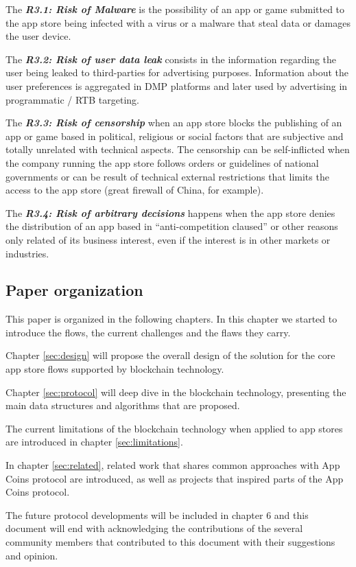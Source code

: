 \begin{tcolorbox}[enhanced jigsaw,sharp corners, drop fuzzy shadow=ShadowColor]

The {\bf\em R3.1: Risk of Malware} is the possibility of an app or game submitted to the app store being infected with a virus or a malware that steal data or damages the user device.

The {\bf\em R3.2: Risk of user data leak} consists in the information regarding the user being leaked to third-parties for advertising purposes. Information about the user preferences is aggregated in DMP platforms and later used by advertising in programmatic / RTB targeting.


The {\bf\em R3.3: Risk of censorship} when an app store blocks the publishing of an app or game based in political, religious or social factors that are subjective and totally unrelated with technical aspects. The censorship can be self-inflicted when the company running the app store follows orders or guidelines of national governments or can be result of technical external restrictions that limits the access to the app store (great firewall of China, for example).

The {\bf\em R3.4: Risk of arbitrary decisions} happens when the app store denies the distribution of an app based in ``anti-competition claused''\cite{PlayTermsService} or other reasons only related of its business interest, even if the interest is in other markets or industries.

\end{tcolorbox}

\subsection{Paper organization}

This paper is organized in the following chapters. In this chapter we started to introduce the flows, the current challenges and the flaws they carry.

Chapter \ref{sec:design} will propose the overall design of the solution for the core app store flows supported by blockchain technology. 

Chapter \ref{sec:protocol} will deep dive in the blockchain technology, presenting the main data structures and algorithms that are proposed.

The current limitations of the blockchain technology when applied to app stores are introduced in chapter \ref{sec:limitations}.

In chapter \ref{sec:related}, related work that shares common approaches with App Coins protocol are introduced, as well as projects that inspired parts of the App Coins protocol.


The future protocol developments will be included in chapter 6 and this document will end with acknowledging the contributions of the several community members that contributed to this document with their suggestions and opinion.



